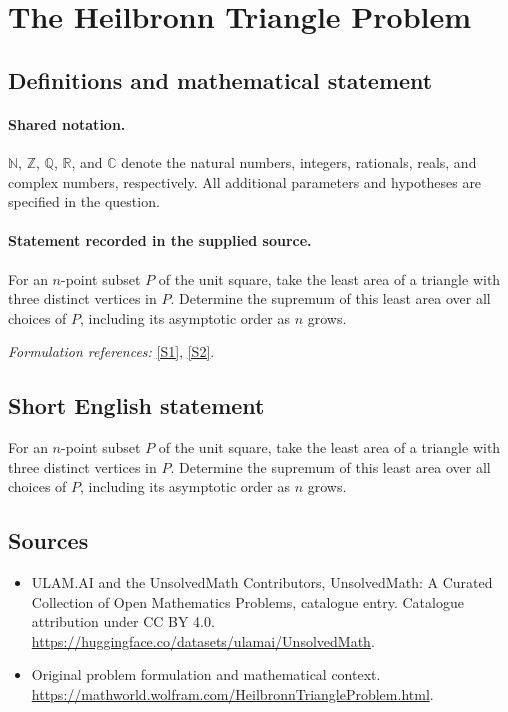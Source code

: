 \documentclass[11pt]{article}
\newcommand{\sref}[2]{\hyperlink{source:#1:#2}{[S#2]}}
\begin{document}
\section{The Heilbronn Triangle Problem}\label{statement}

\subsection{Definitions and mathematical statement}

\paragraph{Shared notation.}$\mathbb N$, $\mathbb Z$, $\mathbb Q$, $\mathbb R$, and $\mathbb C$ denote the natural numbers, integers, rationals, reals, and complex numbers, respectively. All additional parameters and hypotheses are specified in the question.


\paragraph{Statement recorded in the supplied source.}
For an $n$-point subset $P$ of the unit square, take the least area of a triangle with three distinct vertices in $P$. Determine the supremum of this least area over all choices of $P$, including its asymptotic order as $n$ grows.
\par\smallskip\textit{Formulation references:} \sref{statement}{1}, \sref{statement}{2}.
\subsection{Short English statement}
For an $n$-point subset $P$ of the unit square, take the least area of a triangle with three distinct vertices in $P$. Determine the supremum of this least area over all choices of $P$, including its asymptotic order as $n$ grows.
\subsection{Sources}
\begin{itemize}
\item[\hypertarget{source:statement:1}{S1}] ULAM.AI and the UnsolvedMath Contributors, UnsolvedMath: A Curated Collection of Open Mathematics Problems, catalogue entry. Catalogue attribution under CC BY 4.0.
\url{https://huggingface.co/datasets/ulamai/UnsolvedMath}.
\item[\hypertarget{source:statement:2}{S2}] Original problem formulation and mathematical context.
\url{https://mathworld.wolfram.com/HeilbronnTriangleProblem.html}.
\end{itemize}
\label{end:statement}
\end{document}
